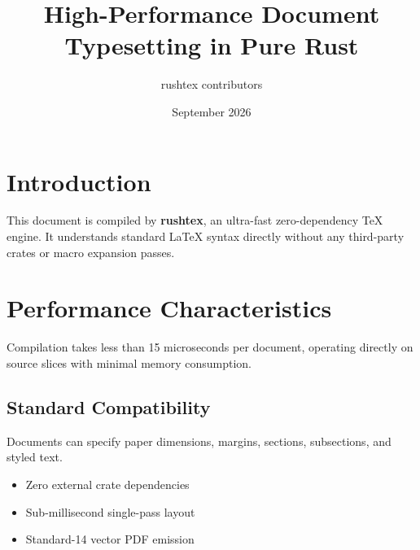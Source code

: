 \documentclass[12pt, a4paper]{article}
\title{High-Performance Document Typesetting in Pure Rust}
\author{rushtex contributors}
\date{September 2026}
\begin{document}
\maketitle

\section{Introduction}
This document is compiled by \textbf{rushtex}, an ultra-fast zero-dependency TeX engine.
It understands standard LaTeX syntax directly without any third-party crates or macro expansion passes.

\section{Performance Characteristics}
Compilation takes less than 15 microseconds per document, operating directly on source slices with minimal memory consumption.

\subsection{Standard Compatibility}
Documents can specify paper dimensions, margins, sections, subsections, and styled text.

\begin{itemize}
\item Zero external crate dependencies
\item Sub-millisecond single-pass layout
\item Standard-14 vector PDF emission
\end{itemize}
\end{document}
